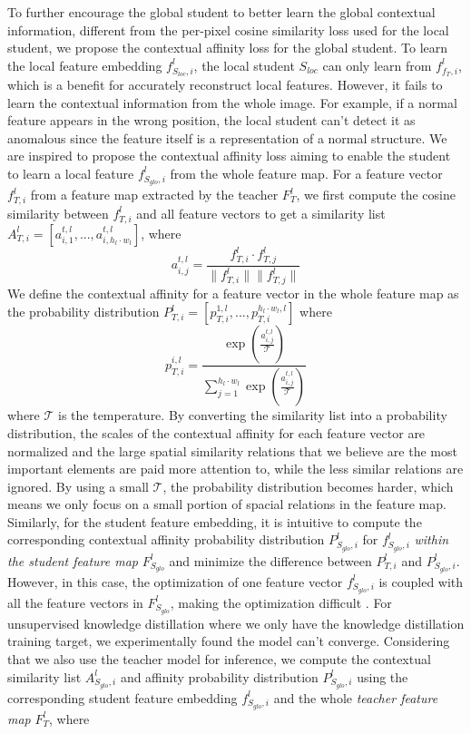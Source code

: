 \documentclass[10pt,twocolumn,letterpaper]{article}
\begin{document}
To further encourage the global student to better learn the global contextual information, different from the per-pixel cosine similarity loss used for the local student, we propose the contextual affinity loss for the global student. To learn the local feature embedding $f_{S_{loc}, i}^l$, the local student $S_{loc}$ can only learn from $f_{f_T, i}^l$, which is a benefit for accurately reconstruct local features. However, it fails to learn the contextual information from the whole image. For example, if a normal feature appears in the wrong position, the local student can't detect it as anomalous since the feature itself is a representation of a normal structure. We are inspired to propose the contextual affinity loss aiming to enable the student to learn a local feature $f_{S_{glo}, i}^l$ from the whole feature map. 
For a feature vector $f_{T, i}^l$ from a feature map extracted by the teacher $F_T^l$, we first compute the cosine similarity between $f_{T, i}^l$ and all feature vectors to get a similarity list $A_{T, i}^l =[a_{i, 1}^{t, l}, ..., a_{i, h_l \cdot w_l}^{t, l}]$, where 
\begin{equation}
    a_{i, j}^{t, l}=\frac{f_{T, i}^l \cdot f_{T, j}^l}{\|f_{T, i}^l\| \|f_{T, j}^l\|}
\end{equation}
We define the contextual affinity for a feature vector in the whole feature map as the probability distribution $P_{T, i}^l = [p_{T, i}^{1, l}, ..., p_{T, i}^{h_l \cdot w_l, l}]$ where
\begin{equation}
    p_{T, i}^{i, l} = \frac{\exp(\frac{{a_{i, j}^{t, l}}}{\mathcal{T}})}{\sum_{j=1}^{h_l \cdot w_l} \exp(\frac{{a_{i, j}^{t, l}}}{\mathcal{T}})}
\end{equation}
where $\mathcal{T}$ is the temperature. By converting the similarity list into a probability distribution, the scales of the contextual affinity for each feature vector are normalized and the large spatial similarity relations that we believe are the most important elements are paid more attention to, while the less similar relations are ignored. By using a small $\mathcal{T}$, the probability distribution becomes harder, which means we only focus on a small portion of spacial relations in the feature map. 
Similarly, for the student feature embedding, it is intuitive to compute the corresponding contextual affinity probability distribution $P_{S_{glo}, i}^l$ for $f_{S_{glo}, i}^l$ \textit{within the student feature map} $F_{S_{glo}}^l$ and minimize the difference between $P_{T, i}^l$ and $P_{S_{glo}, i}^l$. However, in this case, the optimization of one feature vector $f_{S_{glo}, i}^l$ is coupled with all the feature vectors in $F_{S_{glo}}^l$, making the optimization difficult \cite{krahenbuhl2011efficient}. For unsupervised knowledge distillation where we only have the knowledge distillation training target, we experimentally found the model can't converge. Considering that we also use the teacher model for inference, we compute the contextual similarity list $A_{S_{glo}, i}^l$ and affinity probability distribution $P_{S_{glo}, i}^l$ using the corresponding student feature embedding $f_{S_{glo}, i}^l$ and the whole \textit{teacher feature map} $F_T^l$, where
\end{document}
